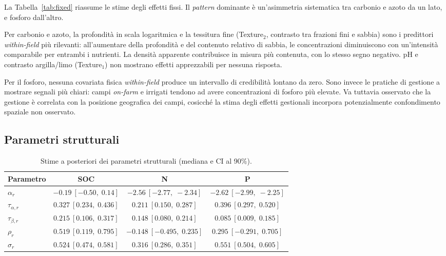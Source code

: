 \documentclass[11pt, a4paper]{article}
\newcommand{\CI}[2]{[#1,\;#2]}
\newcommand{\tauA}[1]{\tau_{\alpha,#1}}
\newcommand{\tauB}[1]{\tau_{\beta,#1}}
\begin{document}
La Tabella~\ref{tab:fixed} riassume le stime degli effetti fissi. Il \textit{pattern} dominante è un'asimmetria sistematica tra carbonio e azoto da un lato, e fosforo dall'altro.

Per carbonio e azoto, la profondità in scala logaritmica e la tessitura fine (Texture$_2$, contrasto tra frazioni fini e sabbia) sono i predittori \textit{within-field} più rilevanti: all'aumentare della profondità e del contenuto relativo di sabbia, le concentrazioni diminuiscono con un'intensità comparabile per entrambi i nutrienti. La densità apparente contribuisce in misura più contenuta, con lo stesso segno negativo. pH e contrasto argilla/limo (Texture$_1$) non mostrano effetti apprezzabili per nessuna risposta.

Per il fosforo, nessuna covariata fisica \textit{within-field} produce un intervallo di credibilità lontano da zero. Sono invece le pratiche di gestione a mostrare segnali più chiari: campi \textit{on-farm} e irrigati tendono ad avere concentrazioni di fosforo più elevate. Va tuttavia osservato che la gestione è correlata con la posizione geografica dei campi, cosicché la stima degli effetti gestionali incorpora potenzialmente confondimento spaziale non osservato.

\subsection{Parametri strutturali}

\begin{table}[htbp]
\centering
\caption{Stime a posteriori dei parametri strutturali (mediana e CI al 90\%).}
\label{tab:main}
\small
\begin{tabular}{@{}lccc@{}}
\toprule
Parametro & SOC & N & P \\
\midrule

$\alpha_r$ &
$-0.19\ \CI{-0.50}{0.14}$ &
$\mathbf{-2.56}\ \CI{-2.77}{-2.34}$ &
$\mathbf{-2.62}\ \CI{-2.99}{-2.25}$ \\[2pt]

$\tauA{r}$ &
$\mathbf{0.327}\ \CI{0.234}{0.436}$ &
$\mathbf{0.211}\ \CI{0.150}{0.287}$ &
$\mathbf{0.396}\ \CI{0.297}{0.520}$ \\[2pt]

$\tauB{r}$ &
$\mathbf{0.215}\ \CI{0.106}{0.317}$ &
$\mathbf{0.148}\ \CI{0.080}{0.214}$ &
$\mathbf{0.085}\ \CI{0.009}{0.185}$ \\[2pt]

$\rho_r$ &
$\mathbf{0.519}\ \CI{0.119}{0.795}$ &
$-0.148\ \CI{-0.495}{0.235}$ &
$0.295\ \CI{-0.291}{0.705}$ \\[2pt]

$\sigma_r$ &
$\mathbf{0.524}\ \CI{0.474}{0.581}$ &
$\mathbf{0.316}\ \CI{0.286}{0.351}$ &
$\mathbf{0.551}\ \CI{0.504}{0.605}$ \\

\bottomrule
\end{tabular}
\end{table}
\end{document}
